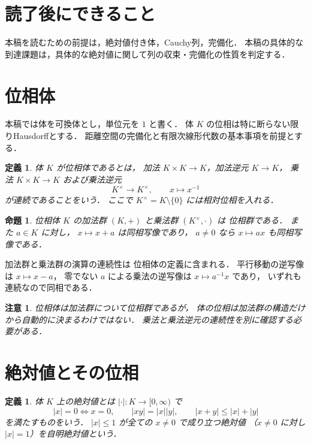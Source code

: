 \documentclass[a5paper,10pt,onecolumn]{jsarticle}
\makeatletter
\theoremstyle{mathnotetheorem}
\newtheorem{definition}[theorem]{定義}
\newtheorem{proposition}[theorem]{命題}
\newtheorem{remark}[theorem]{注意}
\renewcommand{\proofname}{証明}
\renewenvironment{proof}[1][\proofname]{%
  \par\pushQED{\qed}\normalfont\topsep4\p@\@plus2\p@\relax
  \trivlist\item[\hskip\labelsep\bfseries #1]\ignorespaces
}{\popQED\endtrivlist\@endpefalse}
\makeatother
\begin{document}
\section*{読了後にできること}
本稿を読むための前提は，絶対値付き体，Cauchy列，完備化．
本稿の具体的な到達課題は，具体的な絶対値に関して列の収束・完備化の性質を判定する．

\section{位相体}

本稿では体を可換体とし，単位元を $1$ と書く．
体 $K$ の位相は特に断らない限りHausdorffとする．
距離空間の完備化と有限次線形代数の基本事項を前提とする．

\begin{definition}
体 $K$ が\emph{位相体}であるとは，
加法 $K\times K\to K$，加法逆元 $K\to K$，
乗法 $K\times K\to K$ および乗法逆元
\[
 K^\times\longrightarrow K^\times,\qquad x\longmapsto x^{-1}
\]
が連続であることをいう．
ここで $K^\times=K\setminus\{0\}$ には相対位相を入れる．
\end{definition}

\begin{proposition}\label{prop:field-groups}
位相体 $K$ の加法群 $(K,+)$ と乗法群 $(K^\times,\cdot)$ は
位相群である．
また $a\in K$ に対し，
$x\mapsto x+a$ は同相写像であり，
$a\ne0$ なら $x\mapsto ax$ も同相写像である．
\end{proposition}
\begin{proof}
加法群と乗法群の演算の連続性は
位相体の定義に含まれる．
平行移動の逆写像は $x\mapsto x-a$，
零でない $a$ による乗法の逆写像は
$x\mapsto a^{-1}x$ であり，
いずれも連続なので同相である．
\end{proof}

\begin{remark}
位相体は加法群について位相群であるが，
体の位相は加法群の構造だけから自動的に決まるわけではない．
乗法と乗法逆元の連続性を別に確認する必要がある．
\end{remark}

\section{絶対値とその位相}

\begin{definition}
体 $K$ 上の\emph{絶対値}とは
$|\cdot|:K\to[0,\infty)$ で
\[
 |x|=0\iff x=0,\qquad
 |xy|=|x||y|,\qquad
 |x+y|\le|x|+|y|
\]
を満たすものをいう．
$|x|\le1$ が全ての $x\ne0$ で成り立つ絶対値
（$x\ne0$ に対し $|x|=1$）を自明絶対値という．
\end{definition}
\end{document}
